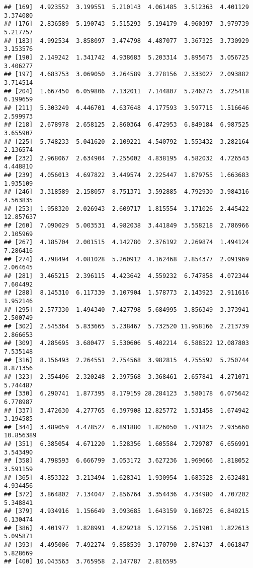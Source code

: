 \documentclass[
]{article}
\begin{document}
\begin{verbatim}
## [169]  4.923552  3.199551  5.210143  4.061485  3.512363  4.401129  3.374080
## [176]  2.836589  5.190743  5.515293  5.194179  4.960397  3.979739  5.217757
## [183]  4.992534  3.858097  3.474798  4.487077  3.367325  3.730929  3.153576
## [190]  2.149242  1.341742  4.938683  5.203314  3.895675  3.056725  3.406277
## [197]  4.683753  3.069050  3.264589  3.278156  2.333027  2.093882  3.714514
## [204]  1.667450  6.059806  7.132011  7.144807  5.246275  3.725418  6.199659
## [211]  5.303249  4.446701  4.637648  4.177593  3.597715  1.516646  2.599973
## [218]  2.678978  2.658125  2.860364  6.472953  6.849184  6.987525  3.655907
## [225]  5.748233  5.041620  2.109221  4.540792  1.553432  3.282164  2.136574
## [232]  2.968067  2.634904  7.255002  4.838195  4.582032  4.726543  4.448810
## [239]  4.056013  4.697822  3.449574  2.225447  1.879755  1.663683  1.935109
## [246]  3.318589  2.158057  8.751371  3.592885  4.792930  3.984316  4.563835
## [253]  1.958320  2.026943  2.609717  1.815554  3.171026  2.445422 12.857637
## [260]  7.090029  5.003531  4.982038  3.441849  3.558218  2.786966  2.105969
## [267]  4.185704  2.001515  4.142780  2.376192  2.269874  1.494124  7.286416
## [274]  4.798494  4.081028  5.260912  4.162468  2.854377  2.091969  2.064645
## [281]  3.465215  2.396115  4.423642  4.559232  6.747858  4.072344  7.604492
## [288]  8.145310  6.117339  3.107904  1.578773  2.143923  2.911616  1.952146
## [295]  2.577330  1.494340  7.427798  5.684995  3.856349  3.373941  2.500749
## [302]  2.545364  5.833665  5.238467  5.732520 11.958166  2.213739  2.866653
## [309]  4.285695  3.680477  5.530606  5.402214  6.588522 12.087803  7.535148
## [316]  8.156493  2.264551  2.754568  3.982815  4.755592  5.250744  8.871356
## [323]  2.354496  2.320248  2.397568  3.368461  2.657841  4.271071  5.744487
## [330]  6.290741  1.877395  8.179159 28.284123  3.580178  6.075642  6.778987
## [337]  3.472630  4.277765  6.397908 12.825772  1.531458  1.674942  3.194585
## [344]  3.489059  4.478527  6.891880  1.826050  1.791825  2.935660 10.856389
## [351]  6.385054  4.671220  1.528356  1.605584  2.729787  6.656991  3.543490
## [358]  4.798593  6.666799  3.053172  3.627236  1.969666  1.818052  3.591159
## [365]  4.853322  3.213494  1.628341  1.930954  1.683528  2.632481  4.934456
## [372]  3.864802  7.134047  2.856764  3.354436  4.734980  4.707202  5.348841
## [379]  4.934916  1.156649  3.093685  1.643159  9.168725  6.840215  6.130474
## [386]  4.401977  1.828991  4.829218  5.127156  2.251901  1.822613  5.095871
## [393]  4.495006  7.492274  9.858539  3.170790  2.874137  4.061847  5.828669
## [400] 10.043563  3.765958  2.147787  2.816595
\end{verbatim}
\end{document}
